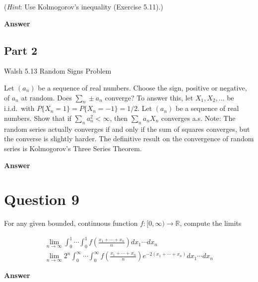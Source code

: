 \documentclass[letterpaper]{article}
\begin{document}
			
		
		(\emph{Hint}: Use Kolmogorov's inequality (Exercise 5.11).)
		

		\textbf{Answer}
		
		\clearpage
		
		\subsection{Part 2}
		{\color{deepred}  Walsh 5.13 Random Signs Problem}
		
		 Let $(a_n)$ be a sequence of real numbers. Choose the sign, positive or negative, of $a_n$ at random. Does $\sum_n \pm a_n$ converge? To answer this, let $X_1,X_2,\ldots$ be i.i.d.\ with $P\{X_n=1\}=P\{X_n=-1\}=1/2$. Let $(a_n)$ be a sequence of real numbers. Show that if $\sum_n a_n^2<\infty$, then $\sum_n a_n X_n$ converges a.s. Note: The random series actually converges if and only if the sum of squares converges, but the converse is slightly harder. The definitive result on the convergence of random series is Kolmogorov's Three Series Theorem.
		
		\textbf{Answer}
		
		\clearpage
		
		\section{Question 9}
		
		For any given bounded, continuous function $f:[0, \infty) \rightarrow \mathbb{R}$, compute the limits
		
		$$
		\begin{gathered}
			\lim _{n \rightarrow \infty} \int_{0}^{1} \cdots \int_{0}^{1} f\left(\frac{x_{1}+\cdots+x_{n}}{n}\right) d x_{1} \cdots d x_{n} \\
			\lim _{n \rightarrow \infty} 2^{n} \int_{0}^{\infty} \cdots \int_{0}^{\infty} f\left(\frac{x_{1}+\cdots+x_{n}}{n}\right) e^{-2\left(x_{1}+\cdots+x_{n}\right)} d x_{1} \cdots d x_{n}
		\end{gathered}
		$$
		
		\textbf{Answer}
		
		\clearpage
		
		
	
\end{document}
